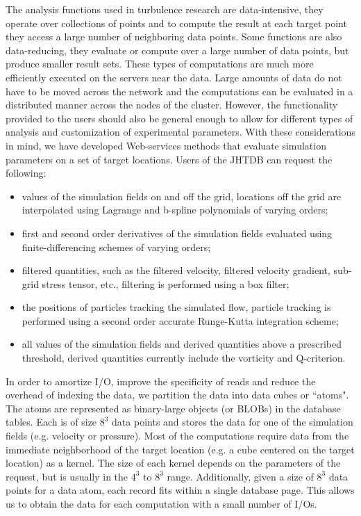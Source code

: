 \documentclass[10pt,twocolumn]{article}
\begin{document}
The analysis functions used in turbulence research are data-intensive, they operate over collections of points and to compute the result at each target point
they access a large number of neighboring data points. Some functions are also data-reducing, they evaluate or compute over a large number of data
points, but produce smaller result sets. These types of computations are much more efficiently executed on the servers near the data. Large amounts of data
do not have to be moved across the network and the computations can be evaluated in a distributed manner across the nodes of the cluster. However, the
functionality provided to the users should also be general enough to allow for different types of analysis and customization of experimental parameters.
With these considerations in mind, we have developed Web-services methods that evaluate simulation parameters on a set of target locations. Users of 
the JHTDB can request the following:
\begin{itemize}
\item values of the simulation fields on and off the grid, locations off the grid are interpolated using Lagrange and b-spline polynomials of varying orders;
\item first and second order derivatives of the simulation fields evaluated using finite-differencing schemes of varying orders;
\item filtered quantities, such as the filtered velocity, filtered velocity gradient, sub-grid stress tensor, etc., filtering is performed using a box filter;
\item the positions of particles tracking the simulated flow, particle tracking is performed using a second order accurate Runge-Kutta integration scheme;
\item all values of the simulation fields and derived quantities above a prescribed threshold, derived quantities currently include the vorticity and Q-criterion.
\end{itemize}

In order to amortize I/O, improve the specificity of reads and reduce the overhead of indexing the data, we partition the data into data cubes or ``atoms".
The atoms are represented as binary-large objects (or BLOBs) in the database tables. Each is of size $8^3$ data points and stores the data for one of the
simulation fields (e.g. velocity or pressure). Most of the computations require data from the immediate neighborhood of the target location (e.g. a cube
centered on the target location) as a kernel. The size of each kernel depends on the parameters of the request, but is usually in the $4^3$ to $8^3$ range.
Additionally, given a size of $8^3$ data points for a data atom, each record fits within a single database page. This allows us to obtain the data for each
computation with a small number of I/Os.
\end{document}
